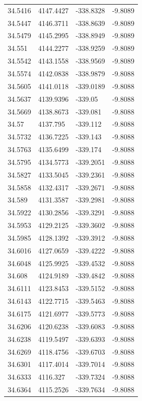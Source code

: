 \begin{table}[H]
\begin{tabular}{llll}
34.5416 & 4147.4427 & -338.8328 & -9.8089 \\
34.5447 & 4146.3711 & -338.8639 & -9.8089 \\
34.5479 & 4145.2995 & -338.8949 & -9.8089 \\
34.551 & 4144.2277 & -338.9259 & -9.8089 \\
34.5542 & 4143.1558 & -338.9569 & -9.8089 \\
34.5574 & 4142.0838 & -338.9879 & -9.8088 \\
34.5605 & 4141.0118 & -339.0189 & -9.8088 \\
34.5637 & 4139.9396 & -339.05 & -9.8088 \\
34.5669 & 4138.8673 & -339.081 & -9.8088 \\
34.57 & 4137.795 & -339.112 & -9.8088 \\
34.5732 & 4136.7225 & -339.143 & -9.8088 \\
34.5763 & 4135.6499 & -339.174 & -9.8088 \\
34.5795 & 4134.5773 & -339.2051 & -9.8088 \\
34.5827 & 4133.5045 & -339.2361 & -9.8088 \\
34.5858 & 4132.4317 & -339.2671 & -9.8088 \\
34.589 & 4131.3587 & -339.2981 & -9.8088 \\
34.5922 & 4130.2856 & -339.3291 & -9.8088 \\
34.5953 & 4129.2125 & -339.3602 & -9.8088 \\
34.5985 & 4128.1392 & -339.3912 & -9.8088 \\
34.6016 & 4127.0659 & -339.4222 & -9.8088 \\
34.6048 & 4125.9925 & -339.4532 & -9.8088 \\
34.608 & 4124.9189 & -339.4842 & -9.8088 \\
34.6111 & 4123.8453 & -339.5152 & -9.8088 \\
34.6143 & 4122.7715 & -339.5463 & -9.8088 \\
34.6175 & 4121.6977 & -339.5773 & -9.8088 \\
34.6206 & 4120.6238 & -339.6083 & -9.8088 \\
34.6238 & 4119.5497 & -339.6393 & -9.8088 \\
34.6269 & 4118.4756 & -339.6703 & -9.8088 \\
34.6301 & 4117.4014 & -339.7014 & -9.8088 \\
34.6333 & 4116.327 & -339.7324 & -9.8088 \\
34.6364 & 4115.2526 & -339.7634 & -9.8088 \\

\end{tabular}
\end{table}
